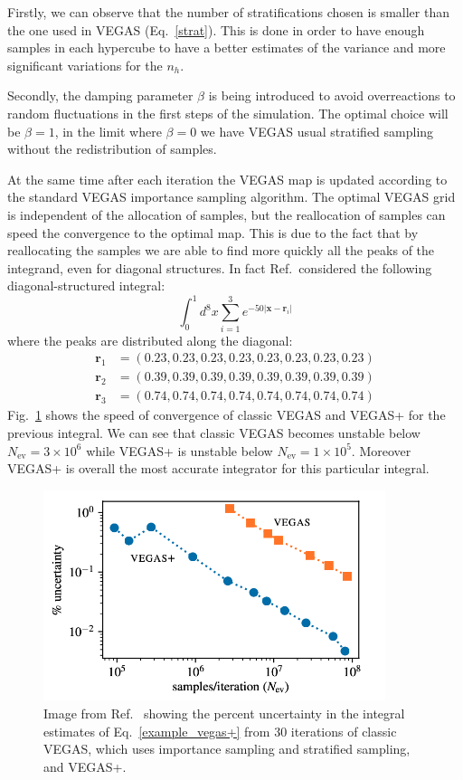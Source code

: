 \documentclass[../main/main.tex]{subfiles}
\begin{document}
Firstly, we can observe that the number of stratifications chosen is smaller than the one used in VEGAS (Eq.~\ref{strat}). This is done in order to
have enough samples in each hypercube to have a better estimates of the variance and more significant variations for the $n_h$. 

Secondly, the damping parameter $\beta$ is being introduced to avoid overreactions to random fluctuations in the first steps of the simulation. The optimal choice will be $\beta=1$, in the limit where $\beta=0$ we have VEGAS usual stratified sampling without the redistribution of samples.

At the same time after each iteration the VEGAS map is updated according to the standard VEGAS importance sampling algorithm. The optimal VEGAS grid is independent of the allocation of samples, but the reallocation of samples can speed the convergence to the optimal map. This is due to the fact that by reallocating the samples we are able to find more quickly all the peaks of the integrand, even for diagonal structures.
In fact Ref.~\cite{Lepage:2020tgj}considered the following diagonal-structured integral:
\begin{equation}
	\label{example_vegas+}
	\int_0^1 d^8 x \sum_{i=1}^3 e^{-50 |\textbf{x}- \textbf{r}_i|}
\end{equation}
where the peaks are distributed along the diagonal:
\begin{eqnarray*}
	\textbf{r}_1 &= (0.23,0.23,0.23,0.23,0.23,0.23,0.23,0.23)  \\
	\textbf{r}_2 &= (0.39,0.39,0.39,0.39,0.39,0.39,0.39,0.39)  \\
	\textbf{r}_3 &=(0.74,0.74,0.74,0.74,0.74,0.74,0.74,0.74)  
\end{eqnarray*}
Fig.~\ref{vegas_vegas+} shows the speed of convergence of classic VEGAS and VEGAS+ for the previous integral. We can see that classic VEGAS becomes unstable below $N_\text{ev} =3 \times 10^6$ while VEGAS+ is unstable below $N_\text{ev} =1 \times 10^5$. Moreover
VEGAS+ is overall the most accurate integrator for this particular integral.

\begin{figure}[h]
	\centering
	\includegraphics[width=10cm]{../images/VEGAS-VEGAS+.png}
	\caption{Image from Ref.~\cite{Lepage:2020tgj} showing the percent uncertainty in the integral estimates of Eq.~\ref{example_vegas+} from 30 iterations of classic VEGAS, which uses importance sampling and stratified sampling,  and VEGAS+.}
	\label{vegas_vegas+}
\end{figure}
\end{document}

